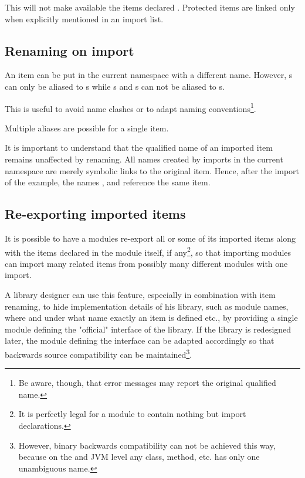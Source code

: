 This will not make available the items declared . 
Protected items are linked only when explicitly mentioned in an import list.


\subsection{Renaming on import} \label{renameitem}

An item can be put in the current namespace with a different name. However, s can only be aliased to s while s and s can not be aliased to s.

This is useful to avoid name clashes or to adapt naming conventions\footnote{
Be aware, though, that error messages may report the original qualified name.}.

Multiple aliases are possible for a single item.


It is important to understand that the qualified name of an imported item remains unaffected by renaming. 
All names created by imports in the current namespace are merely symbolic links to the original item. 
Hence, after the import of the example, the names ,  and  reference the same item. 

\subsection{Re-exporting imported items} \label{reexport}

It is possible to have a modules re-export all or some of its imported items 
along with the items declared in the module itself, if any\footnote{
It is perfectly legal for a module to contain nothing but import declarations.}, 
so that importing  modules can import many related items from possibly many different modules with one import.

A library designer can use this feature, especially in combination with item renaming, 
to hide implementation details of his library, 
such as module names, where and under what name exactly an item is defined etc.,
by providing a single module defining the "official" interface of the library. 
If the library is redesigned later, the module defining the interface can be adapted accordingly 
so that backwards source compatibility can be maintained\footnote{
However, binary backwards compatibility can not be achieved this way, because on the \java{} and JVM level any class,
method, etc. has only one unambiguous name.}.

